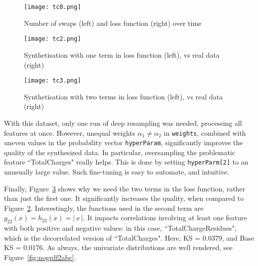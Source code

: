 \documentclass[oneside,10pt]{book}
\begin{document}
\begin{figure}[H]
\centering
\texttt{[image: tc0.png]} %
\caption{Number of swaps (left) and loss function (right) over time}
\label{fig:nofds2abcgff}
\end{figure}


\begin{figure}[H]
\centering
\texttt{[image: tc2.png]} %
\caption{Synthetisation with one term in loss function (left), vs real data (right)}
\label{fig:nofds2abchh}
\end{figure}

\begin{figure}[H]
\centering
\texttt{[image: tc3.png]} %
\caption{Synthetisation with two terms in loss function (left), vs real data (right)}
\label{fig:nogrdf2abchh}
\end{figure}

With this dataset, only one run of deep resampling was needed, processing all features at once. However, unequal weights $\alpha_1 \neq \alpha_2$ in \texttt{weights}, combined with uneven values in the probability vector \texttt{hyperParam}, significantly improves the quality of
 the synthesized data. In particular, oversampling the problematic feature ``TotalCharges" really helps. This is done
 by setting \texttt{hyperParm[2]} to an unusually large value. Such fine-tuning is easy to automate, and intuitive.

Finally, Figure~\ref{fig:nogrdf2abchh} shows why we need the two terms in the loss function, rather than just the first one.
It significantly increases the quality, when compared to Figure~\ref{fig:nofds2abchh}. Interestingly, the functions
 used in the second term are $g_{22}(x) = h_{22}(x) = |\,x\,|$. It impacts correlations involving at least one feature with both positive and negative values:
 in this case, ``TotalChargeResidues", which is the decorrelated version of ``TotalCharges".
 Here, KS = 0.0379, and Base KS = 0.0176. As always, the univariate distributions are well rendered, see Figure~\ref{fig:nogrdf2abc}.



\end{document}
